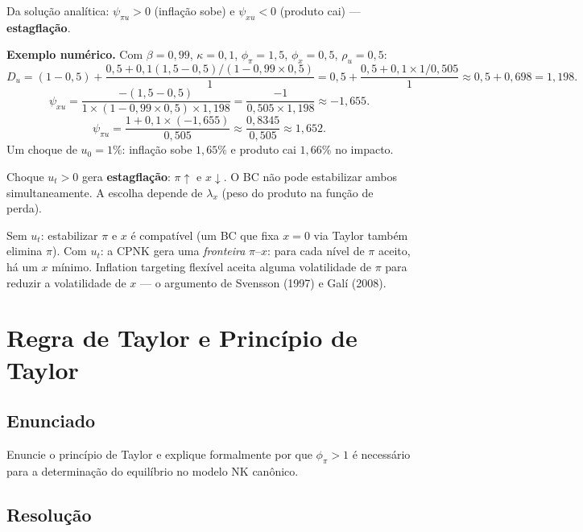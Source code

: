 \documentclass[12pt, a4paper]{article}
\begin{document}
Da solução analítica: $\psi_{\pi u} > 0$ (inflação sobe) e $\psi_{xu} < 0$
(produto cai) --- \textbf{estagflação}.

\textbf{Exemplo numérico.}
Com $\beta=0{,}99$, $\kappa=0{,}1$, $\phi_\pi=1{,}5$, $\phi_x=0{,}5$, $\rho_u=0{,}5$:
\[
D_u = (1-0{,}5) + \frac{0{,}5 + 0{,}1(1{,}5-0{,}5)/(1-0{,}99\times0{,}5)}{1}
= 0{,}5 + \frac{0{,}5 + 0{,}1 \times 1/0{,}505}{1} \approx 0{,}5 + 0{,}698 = 1{,}198.
\]
\[
\psi_{xu} = \frac{-(1{,}5-0{,}5)}{1\times(1-0{,}99\times0{,}5)\times1{,}198}
= \frac{-1}{0{,}505\times1{,}198} \approx -1{,}655.
\]
\[
\psi_{\pi u} = \frac{1 + 0{,}1\times(-1{,}655)}{0{,}505} \approx \frac{0{,}8345}{0{,}505} \approx 1{,}652.
\]
Um choque de $u_0 = 1\%$: inflação sobe $1{,}65\%$ e produto cai $1{,}66\%$ no impacto.

\begin{resultbox}[title={Dilema do BC após custo-push (Q7)}]
Choque $u_t > 0$ gera \textbf{estagflação}: $\pi\uparrow$ e $x\downarrow$.
O BC não pode estabilizar ambos simultaneamente. A escolha depende de $\lambda_x$
(peso do produto na função de perda).
\end{resultbox}

\begin{provabox}[title={Divine Coincidence (Q7)}]
Sem $u_t$: estabilizar $\pi$ e $x$ é compatível (um BC que fixa $x=0$ via Taylor
também elimina $\pi$). Com $u_t$: a CPNK gera uma \emph{fronteira} $\pi$--$x$:
para cada nível de $\pi$ aceito, há um $x$ mínimo.
Inflation targeting flexível aceita alguma volatilidade de $\pi$ para reduzir
a volatilidade de $x$ --- o argumento de Svensson (1997) e Galí (2008).
\end{provabox}

\section{Regra de Taylor e Princípio de Taylor}

\subsection*{Enunciado}
Enuncie o princípio de Taylor e explique formalmente por que $\phi_\pi > 1$ é
necessário para a determinação do equilíbrio no modelo NK canônico.

\subsection*{Resolução}
\end{document}
